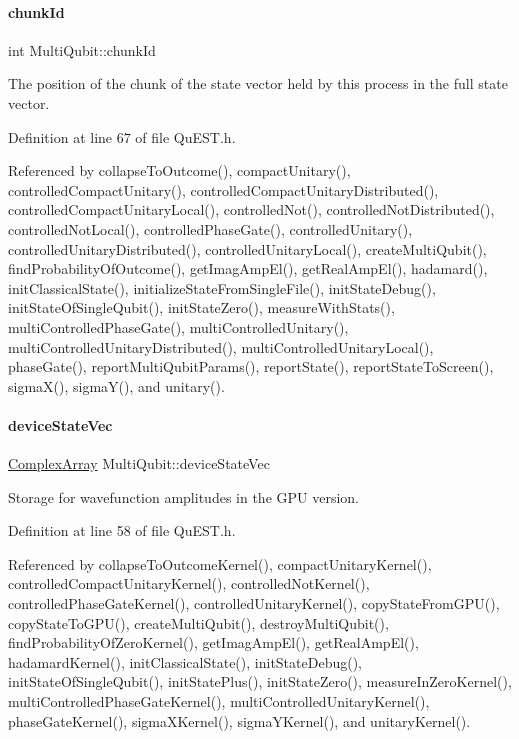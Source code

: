 \paragraph{\texorpdfstring{chunk\+Id}{chunkId}}
{\footnotesize\ttfamily int Multi\+Qubit\+::chunk\+Id}



The position of the chunk of the state vector held by this process in the full state vector. 



Definition at line 67 of file Qu\+E\+S\+T.\+h.



Referenced by collapse\+To\+Outcome(), compact\+Unitary(), controlled\+Compact\+Unitary(), controlled\+Compact\+Unitary\+Distributed(), controlled\+Compact\+Unitary\+Local(), controlled\+Not(), controlled\+Not\+Distributed(), controlled\+Not\+Local(), controlled\+Phase\+Gate(), controlled\+Unitary(), controlled\+Unitary\+Distributed(), controlled\+Unitary\+Local(), create\+Multi\+Qubit(), find\+Probability\+Of\+Outcome(), get\+Imag\+Amp\+El(), get\+Real\+Amp\+El(), hadamard(), init\+Classical\+State(), initialize\+State\+From\+Single\+File(), init\+State\+Debug(), init\+State\+Of\+Single\+Qubit(), init\+State\+Zero(), measure\+With\+Stats(), multi\+Controlled\+Phase\+Gate(), multi\+Controlled\+Unitary(), multi\+Controlled\+Unitary\+Distributed(), multi\+Controlled\+Unitary\+Local(), phase\+Gate(), report\+Multi\+Qubit\+Params(), report\+State(), report\+State\+To\+Screen(), sigma\+X(), sigma\+Y(), and unitary().

\mbox{\label{structMultiQubit_a59ac613486a41b8c9a4b6e79cc8d2cc3}} 
\paragraph{\texorpdfstring{device\+State\+Vec}{deviceStateVec}}
{\footnotesize\ttfamily \mbox{\hyperlink{structComplexArray}{Complex\+Array}} Multi\+Qubit\+::device\+State\+Vec}



Storage for wavefunction amplitudes in the G\+PU version. 



Definition at line 58 of file Qu\+E\+S\+T.\+h.



Referenced by collapse\+To\+Outcome\+Kernel(), compact\+Unitary\+Kernel(), controlled\+Compact\+Unitary\+Kernel(), controlled\+Not\+Kernel(), controlled\+Phase\+Gate\+Kernel(), controlled\+Unitary\+Kernel(), copy\+State\+From\+G\+P\+U(), copy\+State\+To\+G\+P\+U(), create\+Multi\+Qubit(), destroy\+Multi\+Qubit(), find\+Probability\+Of\+Zero\+Kernel(), get\+Imag\+Amp\+El(), get\+Real\+Amp\+El(), hadamard\+Kernel(), init\+Classical\+State(), init\+State\+Debug(), init\+State\+Of\+Single\+Qubit(), init\+State\+Plus(), init\+State\+Zero(), measure\+In\+Zero\+Kernel(), multi\+Controlled\+Phase\+Gate\+Kernel(), multi\+Controlled\+Unitary\+Kernel(), phase\+Gate\+Kernel(), sigma\+X\+Kernel(), sigma\+Y\+Kernel(), and unitary\+Kernel().

